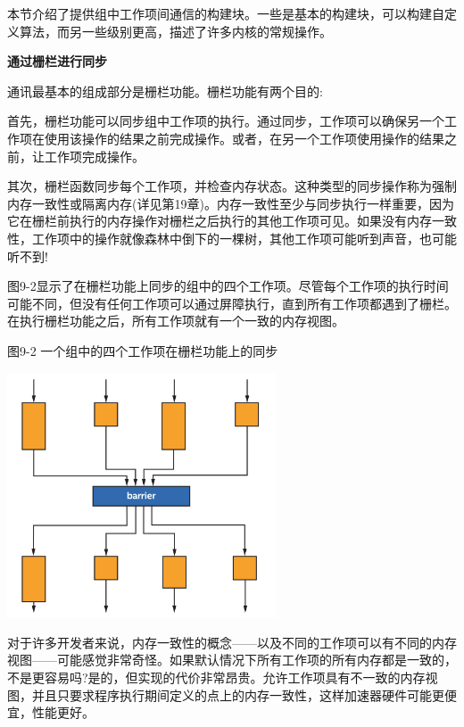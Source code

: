 本节介绍了提供组中工作项间通信的构建块。一些是基本的构建块，可以构建自定义算法，而另一些级别更高，描述了许多内核的常规操作。\par

\hspace*{\fill} \par %
\textbf{通过栅栏进行同步}

通讯最基本的组成部分是栅栏功能。栅栏功能有两个目的:\par

首先，栅栏功能可以同步组中工作项的执行。通过同步，工作项可以确保另一个工作项在使用该操作的结果之前完成操作。或者，在另一个工作项使用操作的结果之前，让工作项完成操作。\par

其次，栅栏函数同步每个工作项，并检查内存状态。这种类型的同步操作称为强制内存一致性或隔离内存(详见第19章)。内存一致性至少与同步执行一样重要，因为它在栅栏前执行的内存操作对栅栏之后执行的其他工作项可见。如果没有内存一致性，工作项中的操作就像森林中倒下的一棵树，其他工作项可能听到声音，也可能听不到!\par

图9-2显示了在栅栏功能上同步的组中的四个工作项。尽管每个工作项的执行时间可能不同，但没有任何工作项可以通过屏障执行，直到所有工作项都遇到了栅栏。在执行栅栏功能之后，所有工作项就有一个一致的内存视图。\par

\hspace*{\fill} \par %
图9-2 一个组中的四个工作项在栅栏功能上的同步
\begin{center}
	\includegraphics[width=0.6\textwidth]{content/chapter-9/images/3}
\end{center}

\begin{tcolorbox}[colback=blue!5!white,colframe=blue!75!black, title=为什么内存在默认情况下不一致?]
对于许多开发者来说，内存一致性的概念——以及不同的工作项可以有不同的内存视图——可能感觉非常奇怪。如果默认情况下所有工作项的所有内存都是一致的，不是更容易吗?是的，但实现的代价非常昂贵。允许工作项具有不一致的内存视图，并且只要求程序执行期间定义的点上的内存一致性，这样加速器硬件可能更便宜，性能更好。
\end{tcolorbox}

